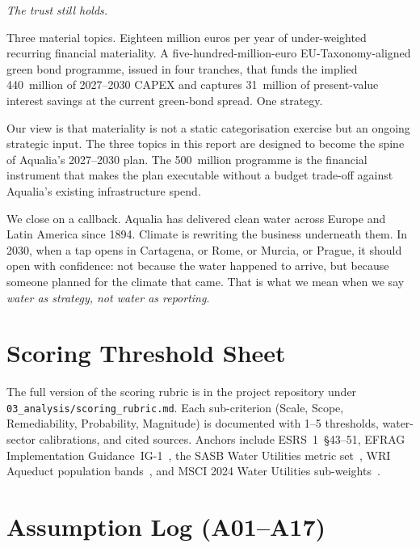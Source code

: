 \documentclass[11pt, a4paper, twoside, openright]{scrreprt}
\newcommand{\euro}{\texteuro}
\begin{document}
\epigraph{\itshape The trust still holds.}{}

Three material topics. Eighteen million euros per year of under-weighted recurring financial materiality. A five-hundred-million-euro EU-Taxonomy-aligned green bond programme, issued in four tranches, that funds the implied \euro{}440~million of 2027--2030 CAPEX and captures \euro{}31~million of present-value interest savings at the current green-bond spread. One strategy.

Our view is that materiality is not a static categorisation exercise but an ongoing strategic input. The three topics in this report are designed to become the spine of Aqualia's 2027--2030 plan. The \euro{}500~million programme is the financial instrument that makes the plan executable without a budget trade-off against Aqualia's existing infrastructure spend.

We close on a callback. Aqualia has delivered clean water across Europe and Latin America since 1894. Climate is rewriting the business underneath them. In 2030, when a tap opens in Cartagena, or Rome, or Murcia, or Prague, it should open with confidence: not because the water happened to arrive, but because someone planned for the climate that came. That is what we mean when we say \emph{water as strategy, not water as reporting}.

\appendix

\chapter{Scoring Threshold Sheet}
\label{app:thresholds}

The full version of the scoring rubric is in the project repository under \texttt{03\_analysis/scoring\_rubric.md}. Each sub-criterion (Scale, Scope, Remediability, Probability, Magnitude) is documented with 1--5 thresholds, water-sector calibrations, and cited sources. Anchors include ESRS~1~\S 43--51, EFRAG Implementation Guidance~IG-1~\cite{efrag2024}, the SASB Water Utilities metric set~\cite{sasb2024}, WRI Aqueduct population bands~\cite{aqueduct2023}, and MSCI 2024 Water Utilities sub-weights~\cite{msci2024}.

\chapter{Assumption Log (A01--A17)}
\label{app:assumptions}
\end{document}
